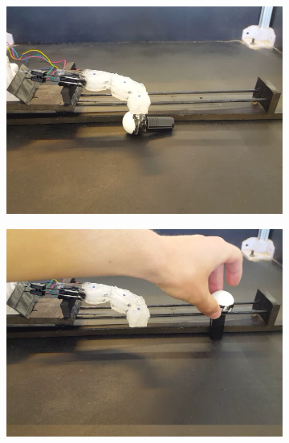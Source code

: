 \documentclass[letterpaper, 10 pt, conference]{ieeeconf}  %
\begin{document}
\begin{figure}[htpb]
        \begin{subfigure}[b]{0.72in} 
                \centering
                \includegraphics[width=\textwidth]{figures/finger/finger6.png}
        \end{subfigure}
        \begin{subfigure}[b]{0.72in}                            
                \centering
                \includegraphics[width=\textwidth]{figures/finger/finger7.png}
        \end{subfigure}
        \begin{subfigure}[b]{0.72in} 
                \centering

\end{subfigure}
\end{figure}
\end{document}
